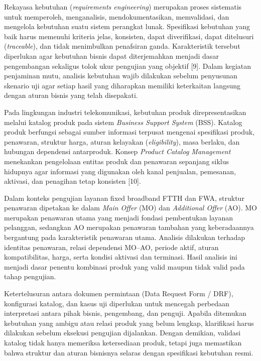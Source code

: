 \documentclass[12pt,a4paper]{article}
\begin{document}
Rekayasa kebutuhan (\textit{requirements engineering}) merupakan proses sistematis untuk memperoleh, menganalisis, mendokumentasikan, memvalidasi, dan mengelola kebutuhan suatu sistem perangkat lunak. Spesifikasi kebutuhan yang baik harus memenuhi kriteria jelas, konsisten, dapat diverifikasi, dapat ditelusuri (\textit{traceable}), dan tidak menimbulkan penafsiran ganda. Karakteristik tersebut diperlukan agar kebutuhan bisnis dapat diterjemahkan menjadi dasar pengembangan sekaligus tolok ukur pengujian yang objektif [9]. Dalam kegiatan penjaminan mutu, analisis kebutuhan wajib dilakukan sebelum penyusunan skenario uji agar setiap hasil yang diharapkan memiliki keterkaitan langsung dengan aturan bisnis yang telah disepakati.

Pada lingkungan industri telekomunikasi, kebutuhan produk direpresentasikan melalui katalog produk pada sistem \textit{Business Support System} (BSS). Katalog produk berfungsi sebagai sumber informasi terpusat mengenai spesifikasi produk, penawaran, struktur harga, aturan kelayakan (\textit{eligibility}), masa berlaku, dan hubungan dependensi antarproduk. Konsep \textit{Product Catalog Management} menekankan pengelolaan entitas produk dan penawaran sepanjang siklus hidupnya agar informasi yang digunakan oleh kanal penjualan, pemesanan, aktivasi, dan penagihan tetap konsisten [10].

Dalam konteks pengujian layanan fixed broadband FTTH dan FWA, struktur penawaran dipetakan ke dalam \textit{Main Offer} (MO) dan \textit{Additional Offer} (AO). MO merupakan penawaran utama yang menjadi fondasi pembentukan layanan pelanggan, sedangkan AO merupakan penawaran tambahan yang keberadaannya bergantung pada karakteristik penawaran utama. Analisis dilakukan terhadap identitas penawaran, relasi dependensi MO--AO, periode aktif, aturan kompatibilitas, harga, serta kondisi aktivasi dan terminasi. Hasil analisis ini menjadi dasar penentu kombinasi produk yang valid maupun tidak valid pada tahap pengujian.

Ketertelusuran antara dokumen permintaan (Data Request Form / DRF), konfigurasi katalog, dan kasus uji diperlukan untuk mencegah perbedaan interpretasi antara pihak bisnis, pengembang, dan penguji. Apabila ditemukan kebutuhan yang ambigu atau relasi produk yang belum lengkap, klarifikasi harus dilakukan sebelum eksekusi pengujian dijalankan. Dengan demikian, validasi katalog tidak hanya memeriksa ketersediaan produk, tetapi juga memastikan bahwa struktur dan aturan bisnisnya selaras dengan spesifikasi kebutuhan resmi.
\end{document}
